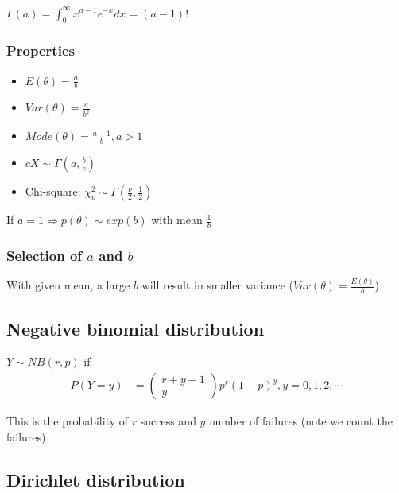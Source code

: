    $\Gamma(a)=\int_0^\infty x^{a-1}e^{-x}dx=(a-1)!$


    \subsubsection{Properties}

    \begin{itemize}
        \item $E(\theta) = \frac{a}{b}$\\
        \item $Var(\theta) = \frac{a}{b^2}$\\
        \item $Mode(\theta) = \frac{a-1}{b}, a > 1$
        \item $cX \sim \Gamma(a, \frac{b}{c})$
        \item Chi-square: $\chi_{\nu}^2 \sim
            \Gamma(\frac{\nu}{2}, \frac{1}{2})$
    \end{itemize}

    If $a=1 \Rightarrow p(\theta)\sim exp(b)$ with mean
    $\frac{1}{b}$

    \subsubsection{Selection of $a$ and $b$}

    With given mean, a large $b$ will result in smaller
    variance ($Var(\theta)=\frac{E(\theta)}{b}$)

    \subsection{Negative binomial distribution}

    $Y\sim NB(r, p)$ if
    \begin{align*}
        P(Y=y) &= \begin{pmatrix}
            r + y - 1\\
            y
            \end{pmatrix} p^r (1-p)^y, y = 0, 1, 2, \cdots
    \end{align*}

    This is the probability of $r$ success and $y$ number of
    failures (note we count the failures)

    \subsection{Dirichlet distribution}

